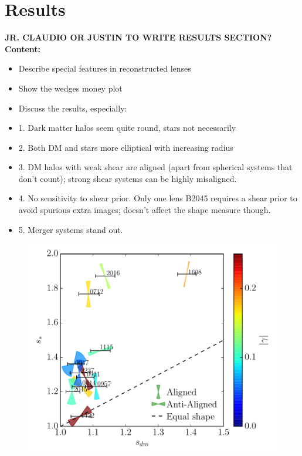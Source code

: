 \documentclass[useAMS,usenatbib]{mn2e}
\begin{document}
\section{Results}\label{sec:results}

{\bf JR. CLAUDIO OR JUSTIN TO WRITE RESULTS SECTION?} 
\textbf{Content:}
\begin{itemize}
\item Describe special features in reconstructed lenses
\item Show the wedges money plot
\item Discuss the results, especially:
\item 1. Dark matter halos seem quite round, stars not necessarily
\item 2. Both DM and stars more elliptical with increasing radius 
\item 3. DM halos with weak shear are aligned (apart from spherical systems that don't count); strong shear systems can be highly misaligned.
\item 4. No sensitivity to shear prior. Only one lens B2045 requires a shear prior to avoid spurious extra images; doesn't affect the shape measure though. 
\item 5. Merger systems stand out. 
\end{itemize}

\begin{figure}
  \centering
  \includegraphics[width=\linewidth]{Figures/wedges_shears.pdf}
  \caption[width=.65\linewidth]{}
  \label{fig:wedges}
\end{figure}
\end{document}
